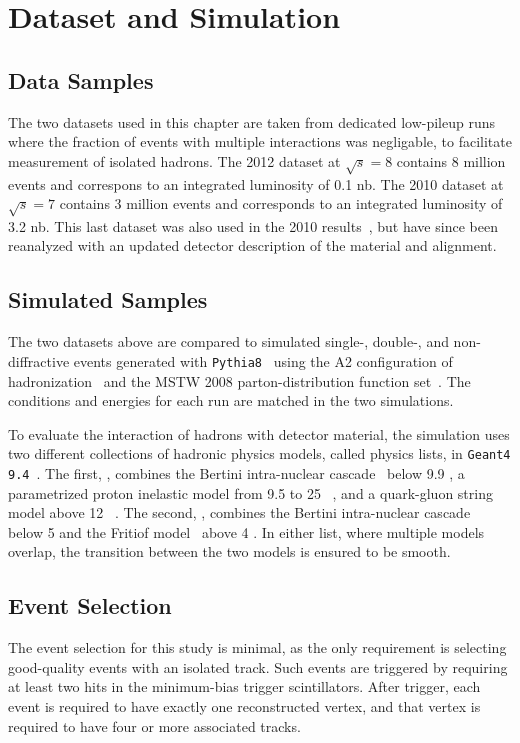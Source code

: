 \section{Dataset and Simulation}

\subsection{Data Samples}
The two datasets used in this chapter are taken from dedicated low-pileup runs where the fraction of events with multiple interactions was negligable, to facilitate measurement of isolated hadrons.
The 2012 dataset at $\sqrt{s} = 8$ \TeV contains 8 million events and correspons to an integrated luminosity of 0.1 nb.
The 2010 dataset at $\sqrt{s} = 7$ \TeV contains 3 million events and corresponds to an integrated luminosity of 3.2 nb.
This last dataset was also used in the 2010 results~\cite{PERF-2011-05}, but have since been reanalyzed with an updated detector description of the material and alignment.

\subsection{Simulated Samples}
The two datasets above are compared to simulated single-, double-, and non-diffractive events generated with \texttt{Pythia8}~\cite{PYTHIA8} using the A2 configuration of hadronization~\cite{AU2} and the MSTW 2008 parton-distribution function set~\cite{MSTW,MSTW2}.
The conditions and energies for each run are matched in the two simulations.

To evaluate the interaction of hadrons with detector material, the simulation uses two different collections of hadronic physics models, called physics lists, in \texttt{Geant4 9.4}~\cite{G4hadronics}.
The first, \QGSP, combines the Bertini intra-nuclear cascade~\cite{BERT21,BERT22,BERT23} below 9.9 \GeV, a parametrized proton inelastic model from 9.5 to 25 \GeV~\cite{GHEISHA20}, and a quark-gluon string model above 12 \GeV~\cite{QGS15,QGS16,QGS17,QGS18,QGS19}. 
The second, \FTFP, combines the Bertini intra-nuclear cascade~\cite{BERT21,BERT22,BERT23} below 5 \GeV and the Fritiof model~\cite{FTF24,FTF25,FTF26,FTF27} above 4 \GeV.
In either list, where multiple models overlap, the transition between the two models is ensured to be smooth.

\subsection{Event Selection}
The event selection for this study is minimal, as the only requirement is selecting good-quality events with an isolated track. 
Such events are triggered by requiring at least two hits in the minimum-bias trigger scintillators. 
After trigger, each event is required to have exactly one reconstructed vertex, and that vertex is required to have four or more associated tracks.

